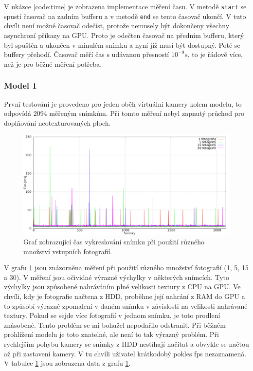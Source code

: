 \documentclass[11pt,twoside,a4paper]{book}
\begin{document}
V ukázce \ref{code:time} je zobrazena implementace měření času. V metodě \texttt{start} se spustí časovač na zadním bufferu a v metodě \texttt{end} se tento časovač ukončí. V tuto chvíli není možné časovač odečíst, protože nemusely být dokončeny všechny asynchroní příkazy na GPU. Proto je odečten časovač na předním bufferu, který byl spuštěn a ukončen v minulém snímku a nyní již musí být dostupný. Poté se buffery přehodí. Časovač měří čas s udávanou přesností $10^{-9}s$, to je řádově více, než je pro běžné měření potřeba.

\subsubsection*{Model 1}
První testování je provedeno pro jeden oběh virtuální kamery kolem modelu, to odpovídá 2094 měřeným snímkům. Při tomto měření nebyl zapnutý průchod pro doplňování neotexturovaných ploch.

\begin{figure}[h]
\begin{center}
\includegraphics[width=\textwidth]{figures/data-1}
\caption{Graf zobrazující čas vykreslování snímku při použití různého množství vstupních fotografií.}
\label{fig:data-1}
\end{center}
\end{figure}


V grafu \ref{fig:data-1} jsou znázorněna měření při použití různého množství fotografií (1, 5, 15 a 30). V měření jsou očividné výrazné výchylky v některých snímcích. Tyto výchylky jsou způsobené nahráváním plné velikosti textury z CPU na GPU. Ve chvíli, kdy je fotografie načtena z  HDD, proběhne její nahrání z RAM do GPU a to způsobí výrazné zpomalení v daném snímku v závislosti na velikosti nahrávané textury. Pokud se sejde více fotografií v jednom snímku, je toto prodlení znásobené. Tento problém se mi bohužel nepodařilo odstranit. Při běžném prohlížení modelu je toto znatelné, ale není to tak výrazný problém. Při rychlejším pohybu kamery se snímky z HDD nestíhají načítat a obvykle se načtou až při zastavení kamery. V tu chvíli uživatel krátkodobý pokles fps nezaznamená. V tabulce \ref{fig:data-1} jsou zobrazena data z grafu \ref{fig:data-1}. 
\end{document}

